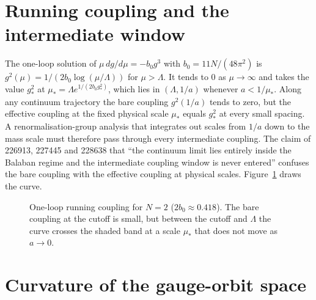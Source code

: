 \documentclass[aps,prd,twocolumn,superscriptaddress,nofootinbib,floatfix]{revtex4-2}
\theoremstyle{definition}
\theoremstyle{remark}
\begin{document}
\section{Running coupling and the intermediate window}
\label{sec:running}

The one-loop solution of $\mu\,dg/d\mu=-b_0g^3$ with
$b_0=11N/(48\pi^2)$ is $g^2(\mu)=1/(2b_0\log(\mu/\Lambda))$ for $\mu>\Lambda$.
It tends to $0$ as $\mu\to\infty$ and takes the value $g_*^2$ at
$\mu_*=\Lambda e^{1/(2b_0g_*^2)}$, which lies in $(\Lambda,1/a)$ whenever
$a<1/\mu_*$. Along any continuum trajectory the bare coupling $g^2(1/a)$
tends to zero, but the effective coupling at the fixed physical scale
$\mu_*$ equals $g_*^2$ at every small spacing. A renormalisation-group
analysis that integrates out scales from $1/a$ down to the mass scale must
therefore pass through every intermediate coupling. The claim of
226913, 227445 and 228638 that ``the continuum limit lies entirely inside
the Balaban regime and the intermediate coupling window is never entered''
confuses the bare coupling with the effective coupling at physical scales.
Figure~\ref{fig:running} draws the curve.

\begin{figure}[t]
\centering
{}
\caption{One-loop running coupling for $N=2$ ($2b_0\approx0.418$). The bare
coupling at the cutoff is small, but between the cutoff and $\Lambda$ the
curve crosses the shaded band at a scale $\mu_*$ that does not move as
$a\to0$.}
\label{fig:running}
\end{figure}

\section{Curvature of the gauge-orbit space}
\label{sec:curvature}
\end{document}
